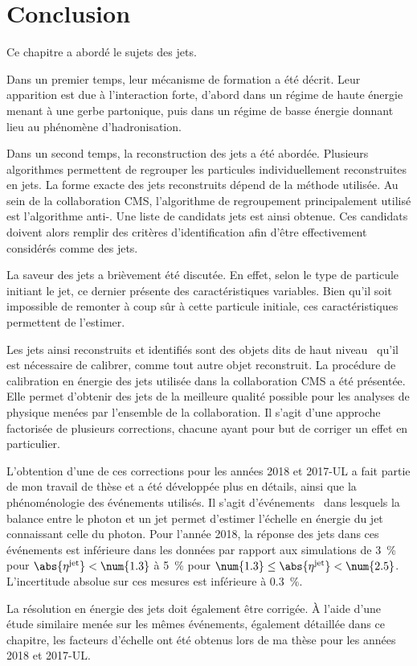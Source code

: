 \section{Conclusion}\label{chapter-JERC-section-conclusion}
Ce chapitre a abordé le sujets des jets.
\par Dans un premier temps, leur mécanisme de formation a été décrit.
Leur apparition est due à l'interaction forte, d'abord dans un régime de haute énergie menant à une gerbe partonique, puis dans un régime de basse énergie donnant lieu au phénomène d'hadronisation.
\par Dans un second temps, la reconstruction des jets a été abordée.
Plusieurs algorithmes permettent de regrouper les particules individuellement reconstruites en jets.
La forme exacte des jets reconstruits dépend de la méthode utilisée.
Au sein de la collaboration CMS, l'algorithme de regroupement principalement utilisé est l'algorithme \og anti-\kT \fg.
Une liste de \og candidats \fg{} jets est ainsi obtenue.
Ces candidats doivent alors remplir des critères d'identification afin d'être effectivement considérés comme des jets.
\par La saveur des jets a brièvement été discutée.
En effet, selon le type de particule initiant le jet, ce dernier présente des caractéristiques variables.
Bien qu'il soit impossible de remonter à coup sûr à cette particule initiale, ces caractéristiques permettent de l'estimer.
\par Les jets ainsi reconstruits et identifiés sont des objets dits de \og haut niveau \fg\ qu'il est nécessaire de calibrer, comme tout autre objet reconstruit.
La procédure de calibration en énergie des jets utilisée dans la collaboration CMS a été présentée.
Elle permet d'obtenir des jets de la meilleure qualité possible pour les analyses de physique menées par l'ensemble de la collaboration.
Il s'agit d'une approche factorisée de plusieurs corrections, chacune ayant pour but de corriger un effet en particulier.
\par L'obtention d'une de ces corrections pour les années 2018 et 2017-UL a fait partie de mon travail de thèse et a été développée plus en détails, ainsi que la phénoménologie des événements utilisés.
Il s'agit d'événements \Gjets\ dans lesquels la balance entre le photon et un jet permet d'estimer l'échelle en énergie du jet connaissant celle du photon.
Pour l'année 2018, la réponse des jets dans ces événements est inférieure dans les données par rapport aux simulations
de
\SI{3}{\%} pour $\abs{\eta^\text{jet}} < \num{1.3}$
à
\SI{5}{\%} pour $\num{1.3} \leq \abs{\eta^\text{jet}} < \num{2.5}$.
L'incertitude absolue sur ces mesures est inférieure à \SI{0.3}{\%}.
\par La résolution en énergie des jets doit également être corrigée.
À l'aide d'une étude similaire menée sur les mêmes événements, également détaillée dans ce chapitre, les facteurs d'échelle ont été obtenus lors de ma thèse pour les années 2018 et 2017-UL.

